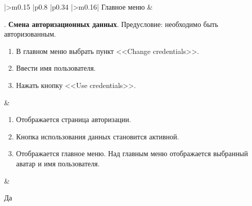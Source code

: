 \begin{landscape}
\begin{longtable}[l]{|>{\centering}m{0.15\textwidth}
					  |p{0.8\textwidth}
					  |p{0.34\textwidth}
					  |>{\centering\arraybackslash}m{0.16\textwidth}|}
	Главное меню &
	\begin{minipage}[t]{1\linewidth}
		\vspace{-1\baselineskip}
		\testnumber. \textbf{Смена авторизационных данных}.\newline
 		Предусловие: необходимо быть авторизованным.
 		\begin{enumerate}
			\item В главном меню выбрать пункт <<Change credentials>>.
 			\item Ввести имя пользователя.
 			\item Нажать кнопку <<Use credentials>>.
 		\end{enumerate}
 	\end{minipage} &
	\begin{minipage}[t]{1\linewidth}
		\vspace{-1\baselineskip}
		\begin{enumerate}
			\item Отображается страница авторизации.
			\item Кнопка использования данных становится активной.
   			\item Отображается главное меню. Над главным меню отображается выбранный аватар и имя пользователя.
		\end{enumerate}
	\end{minipage} \newline &
	\begin{minipage}[t]{1\linewidth}
		\vspace{-1\baselineskip}
		\centering Да
	\end{minipage} \\
	\hline


\end{longtable}
\end{landscape}

